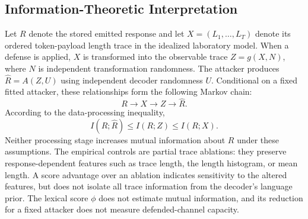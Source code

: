 \documentclass[electronics,article,submit,pdftex,moreauthors]{Definitions/mdpi}
\begin{document}
\subsection{Information-Theoretic Interpretation}
Let $R$ denote the stored emitted response and let $X=(L_1,\ldots,L_T)$ denote its ordered token-payload length trace in the idealized laboratory model. When a defense is applied, $X$ is transformed into the observable trace $Z=g(X,N)$, where $N$ is independent transformation randomness. The attacker produces $\widehat{R}=A(Z,U)$ using independent decoder randomness $U$. Conditional on a fixed fitted attacker, these relationships form the following Markov chain:
\begin{equation}
R \longrightarrow X \longrightarrow Z \longrightarrow \widehat{R}.
\end{equation}
According to the data-processing inequality,
\begin{equation}
I(R;\widehat{R}) \leq I(R;Z) \leq I(R;X).
\end{equation}
Neither processing stage increases mutual information about $R$ under these assumptions. The empirical controls are partial trace ablations: they preserve response-dependent features such as trace length, the length histogram, or mean length. A score advantage over an ablation indicates sensitivity to the altered features, but does not isolate all trace information from the decoder's language prior. The lexical score $\phi$ does not estimate mutual information, and its reduction for a fixed attacker does not measure defended-channel capacity.
\end{document}
